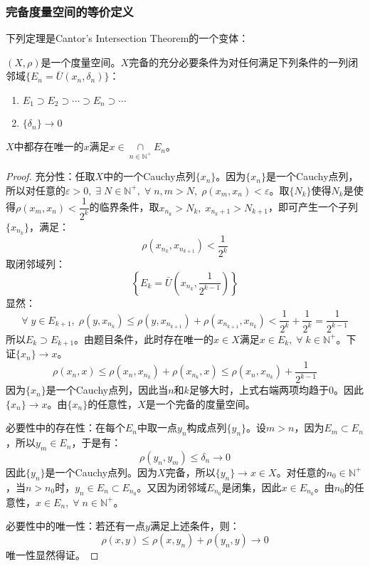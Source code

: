 \subsubsection{完备度量空间的等价定义}
下列定理是Cantor's Intersection Theorem的一个变体：
\begin{theorem}[闭球套定理]
	$(X,\rho)$是一个度量空间。$X$完备的充分必要条件为对任何满足下列条件的一列闭邻域$\{E_n=\overline{U}(x_n,\delta_n)\}$：
	\begin{enumerate}
		\item $E_1\supset E_2\supset\cdots\supset E_n\supset\cdots$
		\item $\{\delta_n\}\to0$
	\end{enumerate}
	$X$中都存在唯一的$x$满足$x\in\underset{n\in\mathbb{N}^+}{\cap}E_n$。
\end{theorem}
\begin{proof}
	充分性：任取$X$中的一个Cauchy点列$\{x_n\}$。因为$\{x_n\}$是一个Cauchy点列，所以对任意的$\varepsilon>0,\;\exists\;N\in\mathbb{N}^+,\;\forall\;n,m>N,\;\rho(x_m,x_n)<\varepsilon$。取$\{N_k\}$使得$N_k$是使得$\rho(x_m,x_n)<\dfrac{1}{2^k}$的临界条件，取$x_{n_k}>N_k,\;x_{n_k+1}>N_{k+1}$，即可产生一个子列 $\{x_{n_k}\}$，满足：
	\begin{equation*}
		\rho(x_{n_k},x_{n_{k+1}})<\frac{1}{2^k}
	\end{equation*}
	取闭邻域列：
	\begin{equation*}
		\left\{E_k=\bar{U}\left(x_{n_k},\frac{1}{2^{k-1}}\right)\right\}
	\end{equation*}
	显然：
	\begin{equation*}
		\forall\;y\in E_{k+1},\;\rho(y,x_{n_k})\leqslant\rho(y,x_{n_{k+1}})+\rho(x_{n_{k+1}},x_{n_k})<\frac{1}{2^k}+\frac{1}{2^k}=\frac{1}{2^{k-1}}
	\end{equation*}
	所以$E_k\supset E_{k+1}$。由题目条件，此时存在唯一的$x\in X$满足$x\in E_k,\;\forall\;k\in\mathbb{N}^+$。下证$\{x_n\}\to x$。
	\begin{equation*}
		\rho(x_n,x)\leqslant\rho(x_n,x_{n_k})+\rho(x_{n_k},x)\leqslant\rho(x_n,x_{n_k})+\frac{1}{2^{k-1}}
	\end{equation*}
	因为$\{x_n\}$是一个Cauchy点列，因此当$n$和$k$足够大时，上式右端两项均趋于$0$。因此$\{x_n\}\to x$。由$\{x_n\}$的任意性，$X$是一个完备的度量空间。\par
	必要性中的存在性：在每个$E_n$中取一点$y_n$构成点列$\{y_n\}$。设$m>n$，因为$E_m\subset E_n$，所以$y_m\in E_n$，于是有：
	\begin{equation*}
		\rho(y_n,y_m)\leqslant\delta_n\to0
	\end{equation*}
	因此$\{y_n\}$是一个Cauchy点列。因为$X$完备，所以$\{y_n\}\to x\in X$。对任意的$n_0\in\mathbb{N}^+$，当$n>n_0$时，$y_n\in E_n\subset E_{n_0}$。又因为闭邻域$E_{n_0}$是闭集，因此$x\in E_{n_0}$。由$n_0$的任意性，$x\in E_n,\;\forall\;n\in\mathbb{N}^+$。\par
	必要性中的唯一性：若还有一点$y$满足上述条件，则：
	\begin{equation*}
		\rho(x,y)\leqslant\rho(x,y_n)+\rho(y_n,y)\to0
	\end{equation*}
	唯一性显然得证。
\end{proof}

